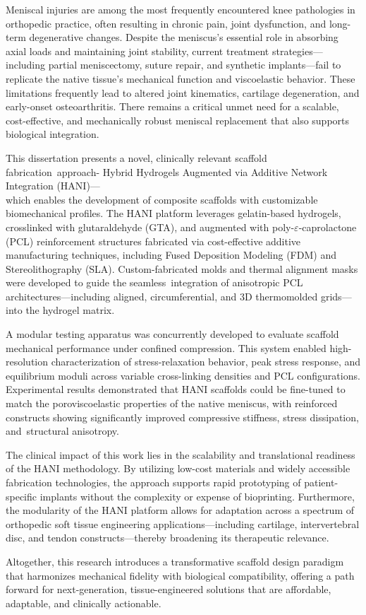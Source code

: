 \dissabstract

Meniscal injuries are among the most frequently encountered knee pathologies in orthopedic practice, often resulting in chronic pain, joint dysfunction, and long-term degenerative changes. Despite the meniscus's essential role in absorbing axial loads and maintaining joint stability, current treatment strategies—including partial meniscectomy, suture repair, and synthetic implants—fail to replicate the native tissue's mechanical function and viscoelastic behavior. These limitations frequently lead to altered joint kinematics, cartilage degeneration, and early-onset osteoarthritis. There remains a critical unmet need for a scalable, cost-effective, and mechanically robust meniscal replacement that also supports biological integration.

This dissertation presents a novel, clinically relevant scaffold fabrication~approach- Hybrid Hydrogels Augmented via Additive Network Integration (HANI)—\\which enables the development of composite scaffolds with customizable biomechanical profiles. The HANI platform leverages gelatin-based hydrogels, crosslinked with glutaraldehyde (GTA), and augmented with poly-$\varepsilon$-caprolactone (PCL) reinforcement structures fabricated via cost-effective additive manufacturing techniques, including Fused Deposition Modeling (FDM) and Stereolithography (SLA). Custom-fabricated molds and thermal alignment masks were developed to guide the seamless~integration of anisotropic PCL architectures—including aligned, circumferential, and 3D thermo\-molded grids—into the hydrogel matrix.

A modular testing apparatus was concurrently developed to evaluate scaffold mechanical performance under confined compression. This system enabled high-resolution characterization of stress-relaxation behavior, peak stress response, and equilibrium moduli across variable cross-linking densities and PCL configurations. Experimental results demonstrated that HANI scaffolds could be fine-tuned to match the poro\-viscoelastic properties of the native meniscus, with reinforced constructs showing significantly improved compressive stiffness, stress dissipation, and~structural anisotropy.

The clinical impact of this work lies in the scalability and translational readiness of the HANI methodology. By utilizing low-cost materials and widely accessible fabrication technologies, the approach supports rapid prototyping of patient-specific implants without the complexity or expense of bioprinting. Furthermore, the modularity of the HANI platform allows for adaptation across a spectrum of orthopedic soft tissue engineering applications—including cartilage, intervertebral disc, and tendon constructs—thereby broadening its therapeutic relevance.

Altogether, this research introduces a transformative scaffold design paradigm that harmonizes mechanical fidelity with biological compatibility, offering a path forward for next-generation, tissue-engineered solutions that are affordable, adaptable, and clinically actionable.
    
    